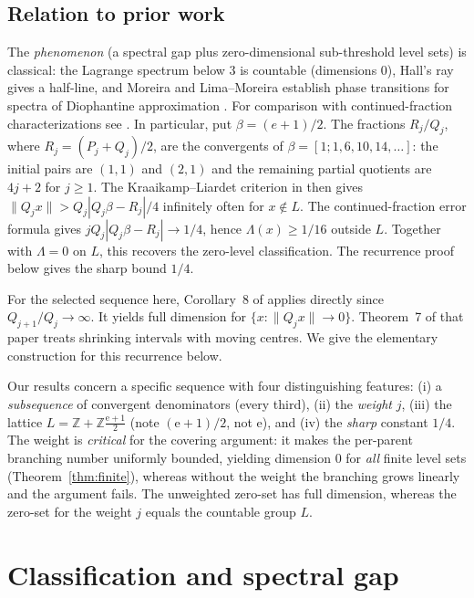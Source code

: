 \documentclass[11pt]{article}
\theoremstyle{definition}
\theoremstyle{remark}
\newcommand{\Z}{\mathbb{Z}}
\newcommand{\ee}{\mathrm{e}}
\begin{document}
\subsection{Relation to prior work}\label{sec:prior}

The \emph{phenomenon} (a spectral gap plus zero-dimensional sub-threshold level
sets) is classical: the Lagrange spectrum below $3$ is countable
(dimensions $0$), Hall's ray gives a half-line, and Moreira and Lima--Moreira
establish phase transitions for spectra of Diophantine approximation
\cite{Moreira,LimaMoreira}. For comparison with continued-fraction characterizations see
\cite{KL,BDS}. In particular, put $\beta=(e+1)/2$. The fractions
$R_j/Q_j$, where $R_j=(P_j+Q_j)/2$, are the convergents of
$\beta=[1;1,6,10,14,\ldots]$: the initial pairs are $(1,1)$ and
$(2,1)$ and the remaining partial quotients are $4j+2$ for $j\ge1$.
The Kraaikamp--Liardet criterion in \cite[p.~106, Lem.~4.1]{BDS} then
gives $\|Q_jx\|>Q_j|Q_j\beta-R_j|/4$ infinitely often for $x\notin L$.
The continued-fraction error formula gives
$jQ_j|Q_j\beta-R_j|\to1/4$, hence $\Lambda(x)\ge1/16$ outside $L$.
Together with $\Lambda=0$ on $L$, this recovers the zero-level
classification. The recurrence proof below gives the sharp bound $1/4$.

For the selected sequence here, Corollary~8 of \cite{BLR}
applies directly since $Q_{j+1}/Q_j\to\infty$. It yields full dimension
for $\{x:\|Q_jx\|\to0\}$. Theorem~7 of that paper treats shrinking
intervals with moving centres. We give the elementary construction
for this recurrence below.

Our results concern a specific sequence with four distinguishing
features: (i) a \emph{subsequence} of convergent denominators (every third),
(ii) the \emph{weight} $j$, (iii) the lattice $L=\Z+\Z\frac{\ee+1}{2}$ (note
$(\ee+1)/2$, not $\ee$), and (iv) the \emph{sharp} constant $1/4$. The weight is
\emph{critical} for the covering argument: it makes the per-parent branching
number uniformly bounded, yielding dimension $0$ for \emph{all} finite level
sets (Theorem~\ref{thm:finite}), whereas without the weight the branching grows
linearly and the argument fails. The unweighted zero-set has full dimension, whereas the zero-set
for the weight $j$ equals the countable group $L$.

\section{Classification and spectral gap}
\end{document}
